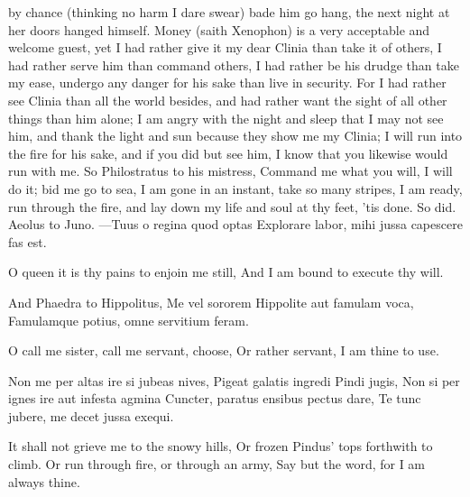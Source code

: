 by chance (thinking no harm I dare swear) bade him go hang, the next
night at her doors hanged himself. Money (saith Xenophon) is a
very acceptable and welcome guest, yet I had rather give it my dear
Clinia than take it of others, I had rather serve him than command
others, I had rather be his drudge than take my ease, undergo any
danger for his sake than live in security. For I had rather see Clinia
than all the world besides, and had rather want the sight of all other
things than him alone; I am angry with the night and sleep that I may
not see him, and thank the light and sun because they show me my
Clinia; I will run into the fire for his sake, and if you did but see
him, I know that you likewise would run with me. So Philostratus to his
mistress, Command me what you will, I will do it; bid me go to
sea, I am gone in an instant, take so many stripes, I am ready, run
through the fire, and lay down my life and soul at thy feet, 'tis done.
So did. Aeolus to Juno.
---Tuus o regina quod optas
Explorare labor, mihi jussa capescere fas est.

O queen it is thy pains to enjoin me still,
And I am bound to execute thy will.

And Phaedra to Hippolitus,
Me vel sororem Hippolite aut famulam voca,
Famulamque potius, omne servitium feram.

O call me sister, call me servant, choose,
Or rather servant, I am thine to use.

Non me per altas ire si jubeas nives,
Pigeat galatis ingredi Pindi jugis,
Non si per ignes ire aut infesta agmina
Cuncter, paratus ensibus pectus dare,
Te tunc jubere, me decet jussa exequi.

It shall not grieve me to the snowy hills,
Or frozen Pindus' tops forthwith to climb.
Or run through fire, or through an army,
Say but the word, for I am always thine.

